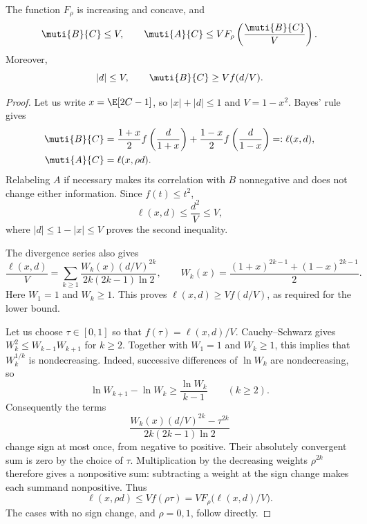 \begin{lemma}
\label{lem:comparison-calculus}
The function $F_\rho$ is increasing and concave, and
\begin{equation*}
  \muti{B}{C}\le V,
  \qquad
  \muti{A}{C}\le V F_\rho\left(\frac{\muti{B}{C}}V\right).
\end{equation*}
Moreover,
\begin{equation*}
  |d|\le V,
  \qquad \muti{B}{C}\ge V f(d/V).
\end{equation*}
\end{lemma}
\begin{proof}
Let us write $x=\E[2C-1]$, so $|x|+|d|\le1$ and
$V=1-x^2$. Bayes' rule gives
\begin{align*}
  \muti{B}{C}
  &=\frac{1+x}{2}f\left(\frac{d}{1+x}\right)
  +\frac{1-x}{2}f\left(\frac{d}{1-x}\right)
  =:\ell(x,d),\\
  \muti{A}{C}&=\ell(x,\rho d).
\end{align*}
Relabeling $A$ if necessary makes its correlation with $B$
nonnegative and does not change either information.
Since $f(t)\le t^2$,
\begin{equation*}
  \ell(x,d)\le\frac{d^2}{V}\le V,
\end{equation*}
where $|d|\le1-|x|\le V$ proves the second inequality.

The divergence series also gives
\begin{equation*}
  \frac{\ell(x,d)}V
  =\sum_{k\ge1}
  \frac{W_k(x)(d/V)^{2k}}{2k(2k-1)\ln2},
  \qquad
  W_k(x)=\frac{(1+x)^{2k-1}+(1-x)^{2k-1}}2.
\end{equation*}
Here $W_1=1$ and $W_k\ge1$. This proves
$\ell(x,d)\ge Vf(d/V)$, as required for the lower bound.

Let us choose $\tau\in[0,1]$ so that $f(\tau)=\ell(x,d)/V$.
Cauchy--Schwarz gives $W_k^2\le W_{k-1}W_{k+1}$ for $k\ge2$.
Together with $W_1=1$ and $W_k\ge1$, this implies that
$W_k^{1/k}$ is nondecreasing. Indeed, successive differences of
$\ln W_k$ are nondecreasing, so
\begin{equation*}
  \ln W_{k+1}-\ln W_k\ge\frac{\ln W_k}{k-1}
  \qquad(k\ge2).
\end{equation*}
Consequently the terms
\begin{equation*}
  \frac{W_k(x)(d/V)^{2k}-\tau^{2k}}{2k(2k-1)\ln2}
\end{equation*}
change sign at most once, from negative to positive.
Their absolutely convergent sum is zero by the choice of $\tau$.
Multiplication by the decreasing weights $\rho^{2k}$ therefore
gives a nonpositive sum: subtracting a weight at the sign change
makes each summand nonpositive.
Thus
\begin{equation*}
  \ell(x,\rho d)\le Vf(\rho\tau)
  =VF_\rho\bigl(\ell(x,d)/V\bigr).
\end{equation*}
The cases with no sign change, and $\rho=0,1$, follow directly.


\end{proof}
